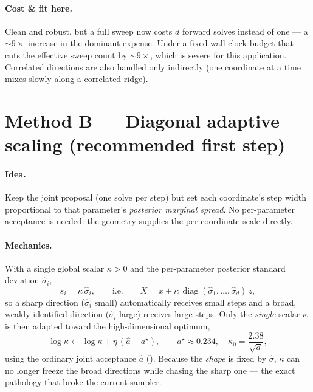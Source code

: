 \documentclass[11pt]{article}
\begin{document}
\paragraph{Cost \& fit here.} Clean and robust, but a full sweep now costs
$d$ forward solves instead of one --- a $\sim\!9\times$ increase in the
dominant expense. Under a fixed wall-clock budget that cuts the effective
sweep count by $\sim\!9\times$, which is severe for this application.
Correlated directions are also handled only indirectly (one coordinate at
a time mixes slowly along a correlated ridge).

\section{Method B --- Diagonal adaptive scaling (recommended first step)}

\paragraph{Idea.} Keep the joint proposal (one solve per step) but set each
coordinate's step width proportional to that parameter's \emph{posterior
marginal spread}. No per-parameter acceptance is needed: the geometry
supplies the per-coordinate scale directly.

\paragraph{Mechanics.} With a single global scalar $\kappa>0$ and the
per-parameter posterior standard deviation $\hat\sigma_i$,
\begin{equation}
  s_i = \kappa\,\hat\sigma_i,
  \qquad\text{i.e.}\qquad
  X = x + \kappa\,\operatorname{diag}(\hat\sigma_1,\dots,\hat\sigma_d)\,z,
  \label{eq:diag}
\end{equation}
so a sharp direction ($\hat\sigma_i$ small) automatically receives small
steps and a broad, weakly-identified direction ($\hat\sigma_i$ large)
receives large steps. Only the \emph{single} scalar $\kappa$ is then
adapted toward the high-dimensional optimum,
\begin{equation}
  \log\kappa \leftarrow \log\kappa + \eta\,(\hat a - a^\star),
  \qquad a^\star\approx 0.234,\quad
  \kappa_0 = \frac{2.38}{\sqrt d},
  \label{eq:kappa}
\end{equation}
using the ordinary joint acceptance $\hat a$ (\cite{roberts2001}). Because
the \emph{shape} is fixed by $\hat\sigma$, $\kappa$ can no longer freeze
the broad directions while chasing the sharp one --- the exact pathology
that broke the current sampler.
\end{document}
